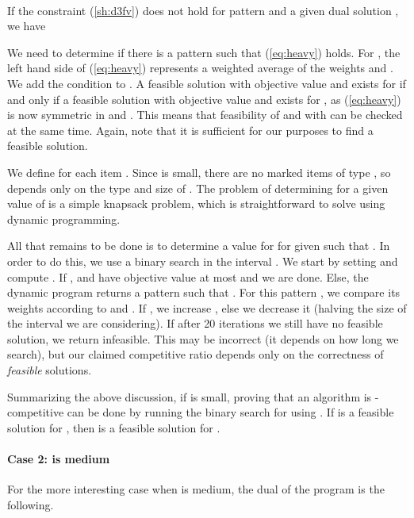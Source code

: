 \LPblocktag{}{\label{linprog:dp2}}\begin{minipage}{\linewidth-2cm}
	~
\end{minipage}
If the constraint (\ref{sh:d3fv}) does not hold for pattern  and a given
dual solution , we have

We need to determine if there is a pattern such that (\ref{eq:heavy}) holds.
For , the left hand side of (\ref{eq:heavy}) represents a weighted average of the weights  and .
We add the condition  to .
A feasible solution with objective value  and  exists for  if and only if
a feasible solution with objective value  and  exists for , as (\ref{eq:heavy}) is
now symmetric in  and .
This means that feasibility of  and  with   can be checked at the same time.
Again, note that it is sufficient for our purposes to find a feasible solution.

We define  for each item . 
Since  is small, there are no marked items of type , so  depends only on the type
and size of .
The problem of determining  for a given value of  is a simple knapsack problem, which is straightforward to solve using dynamic programming. 

All that remains to be done is to determine a value for  for given  such that .
{In order to do this, we use a binary search in the interval .}
We start by setting  and compute . If ,  and  have objective value at most  and we are done. Else, the dynamic program returns a pattern  such that . For this pattern , we compare its weights according to  and .
If , we increase , else we decrease it (halving
the size of the interval we are considering).
If after 20 iterations we still have no feasible solution, we return
infeasible. This may be incorrect (it depends on how long we search), 
but our claimed competitive ratio depends only on the correctness of 
\emph{feasible} solutions.

Summarizing the above discussion, if {  is small},
proving that an \EHarm{} algorithm is -competitive can be done by 
running the binary search for  using .
If  is a feasible solution for , then  is a feasible solution for .


\paragraph{Case 2:   is medium}

For the more interesting case {when   is medium}, the dual  of the program  is the following.

\LPblocktag{}{\label{linprog:dp1}}\begin{minipage}{\linewidth-2cm}
	~
\end{minipage}


